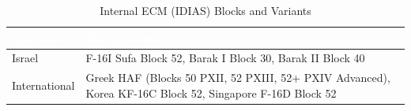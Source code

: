 \documentclass[11pt, a4paper, twoside]{report}
\begin{document}
\begin{table}[H]
\centering
\caption{Internal ECM (IDIAS) Blocks and Variants}
\label{tab:C5-S3-internal-ecm}
\small
\renewcommand{\arraystretch}{1.25}
\begin{tabular}{|>{\raggedright\arraybackslash}p{3.0cm}|>{\raggedright\arraybackslash}p{5.8cm}|}
\hline
\rowcolor{headerblue}
\textcolor{white}{\textbf{Operator}} & \textcolor{white}{\textbf{Block/Variant}} \\
\hline
Israel & F-16I Sufa Block 52, Barak I Block 30, Barak II Block 40 \\
\hline
International & Greek HAF (Blocks 50 PXII, 52 PXIII, 52+ PXIV Advanced),
Korea KF-16C Block 52, Singapore F-16D Block 52 \\
\hline
\end{tabular}
\end{table}

\end{document}
